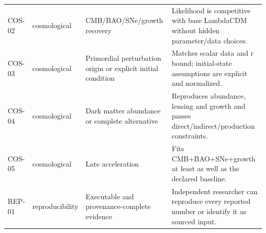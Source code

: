\begin{longtable}{@{}p{0.9cm}p{1.25cm}p{3.15cm}p{7.7cm}@{}}
COS-02 & cosmological & CMB/BAO/SNe/growth recovery & Likelihood is competitive with base LambdaCDM without hidden parameter/data choices. \\
COS-03 & cosmological & Primordial perturbation origin or explicit initial condition & Matches scalar data and r bound; initial-state assumptions are explicit and normalized. \\
COS-04 & cosmological & Dark matter abundance or complete alternative & Reproduces abundance, lensing and growth and passes direct/indirect/production constraints. \\
COS-05 & cosmological & Late acceleration & Fits CMB+BAO+SNe+growth at least as well as the declared baseline. \\
REP-01 & reproducibility & Executable and provenance-complete evidence & Independent researcher can reproduce every reported number or identify it as sourced input. \\
\bottomrule
\end{longtable}
\endgroup
